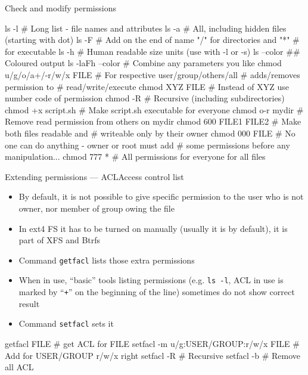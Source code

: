 \documentclass[hyperref={bookmarks=true, unicode=true, colorlinks=true, pdftitle={Linux, command line and MetaCentrum}, plainpages=false, pdfauthor={Vojtech Zeisek}, pdfsubject={Course about use of Linux command line, writing shell scripts and using MetaCentrum of CESNET}, pdfcreator={XeLaTeX, http://www.xelatex.org/}, pdfkeywords={Linux, GNU, BASH, shell, command line, MetaCentrum}, linkcolor=Sienna, anchorcolor=black, citecolor=green, filecolor=magenta, menucolor=Sienna, urlcolor=cyan, pdftex}, compress, ucs, xelatex, xcolor=svgnames, 11pt]{beamer}
\begin{document}
\begin{frame}[fragile]{Check and modify permissions}
  \begin{bashcode}
    ls -l # Long list - file names and attributes
    ls -a # All, including hidden files (starting with dot)
    ls -F # Add on the end of name "/" for directories and "*"
          # for executable
    ls -h # Human readable size units (use with -l or -s)
    ls --color ## Coloured output
    ls -laFh --color # Combine any parameters you like
    chmod u/g/o/a+/-r/w/x FILE # For respective user/group/others/all
                               # adds/removes permission to
                               # read/write/execute
    chmod XYZ FILE # Instead of XYZ use number code of permission
    chmod -R # Recursive (including subdirectories)
    chmod +x script.sh # Make script.sh executable for everyone
    chmod o-r mydir # Remove read permission from others on mydir
    chmod 600 FILE1 FILE2 # Make both files readable and
                          # writeable only by their owner
    chmod 000 FILE # No one can do anything - owner or root must add
                   # some permissions before any manipulation...
    chmod 777 * # All permissions for everyone for all files
  \end{bashcode}
\end{frame}

\begin{frame}[fragile, label=acl]{Extending permissions --- ACL}{Access control list}
\begin{itemize}
  \item By default, it is not possible to give specific permission to the user who is not owner, nor member of group owing the file
  \item In ext4 FS it has to be turned on manually (usually it is by default), it is part of XFS and Btrfs
  \item Command \texttt{getfacl} lists those extra permissions
  \item When in use, ``basic'' tools listing permissions (e.g. \texttt{ls -l}, ACL in use is marked by ``\texttt{+}'' on the beginning of the line) sometimes do not show correct result
  \item Command \texttt{setfacl} sets it
\end{itemize}
  \begin{bashcode}
    getfacl FILE # get ACL for FILE
    setfacl -m u/g:USER/GROUP:r/w/x FILE # Add for USER/GROUP r/w/x right
    setfacl -R # Recursive
    setfacl -b # Remove all ACL
  \end{bashcode}
\end{frame}
\end{document}
